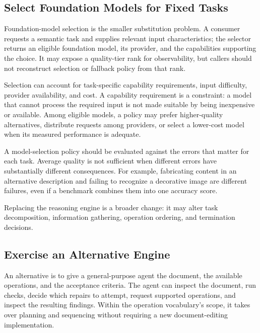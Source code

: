 \subsection*{Select Foundation Models for Fixed Tasks}\label{heading:select-models-for-fixed-tasks}

Foundation-model selection is the smaller substitution problem. A consumer requests a semantic task and supplies relevant input characteristics; the selector returns an eligible foundation model, its provider, and the capabilities supporting the choice. It may expose a quality-tier rank for observability, but callers should not reconstruct selection or fallback policy from that rank.

Selection can account for task-specific capability requirements, input difficulty, provider availability, and cost. A capability requirement is a constraint: a model that cannot process the required input is not made suitable by being inexpensive or available. Among eligible models, a policy may prefer higher-quality alternatives, distribute requests among providers, or select a lower-cost model when its measured performance is adequate.

A model-selection policy should be evaluated against the errors that matter for each task. Average quality is not sufficient when different errors have substantially different consequences. For example, fabricating content in an alternative description and failing to recognize a decorative image are different failures, even if a benchmark combines them into one accuracy score.

Replacing the reasoning engine is a broader change: it may alter task decomposition, information gathering, operation ordering, and termination decisions.

\subsection*{Exercise an Alternative Engine}\label{heading:exercise-an-alternative-engine}

An alternative is to give a general-purpose agent the document, the available operations, and the acceptance criteria. The agent can inspect the document, run checks, decide which repairs to attempt, request supported operations, and inspect the resulting findings. Within the operation vocabulary's scope, it takes over planning and sequencing without requiring a new document-editing implementation.

